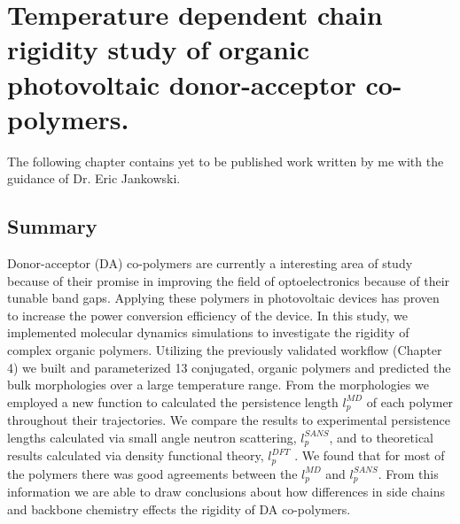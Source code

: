 \chapter{Temperature dependent chain rigidity study of organic photovoltaic donor-acceptor co-polymers.}
The following chapter contains yet to be published work written by me with the guidance of Dr. Eric Jankowski. 
\label{chap:PersistenceLength}
\section{Summary} 
Donor-acceptor (DA) co-polymers are currently a interesting area of study because of their promise in improving the field of optoelectronics because of their tunable band gaps. Applying these polymers in photovoltaic devices has proven to increase the power conversion efficiency of the device. In this study, we implemented molecular dynamics simulations to investigate the rigidity of complex organic polymers. Utilizing the previously validated workflow (Chapter 4) we built and parameterized 13 conjugated, organic polymers and predicted the bulk morphologies over a large temperature range. From the morphologies we employed a new function to calculated the persistence length $l_p^{MD}$ of each polymer throughout their trajectories. We compare the results to experimental persistence lengths calculated via small angle neutron scattering, $l_p^{SANS}$, and to theoretical results calculated via density functional theory, $l_p^{DFT}$ . We found that for most of the polymers there was good agreements between the $l_p^{MD}$ and $l_p^{SANS}$. From this information we are able to draw conclusions about how differences in side chains and backbone chemistry effects the rigidity of DA co-polymers. 
